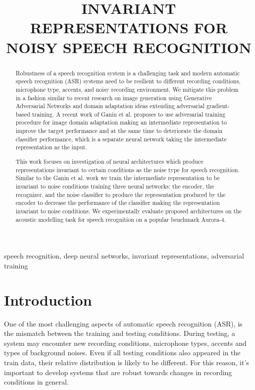 \documentclass{article}
\title{INVARIANT REPRESENTATIONS FOR NOISY SPEECH RECOGNITION}
\begin{document}
%
\maketitle
%
\begin{abstract}
    Robustness of a speech recognition system is a challenging task and modern
    automatic speech recognition (ASR) systems need to be resilient to different recording conditions,
    microphone type, accents, and noisy recording environment. We mitigate
    this problem in a fashion similar to recent research on image generation using
    Generative Adversarial Networks and domain adaptation ideas extending
    adversarial gradient-based training. A recent work of Ganin et al. proposes to
    use adversarial training procedure for image domain adaptation making an intermediate
    representation to improve the target performance and at the same time
    to deteriorate the domain classifier performance, which is a separate neural
    network taking the intermediate representation as the input.

    This work focuses on investigation of neural architectures which produce
    representations invariant to certain conditions as the noise type for speech
    recognition. Similar
    to the Ganin et al. work we train the intermediate representation to be invariant
    to noise conditions training three neural networks: the encoder, the recognizer, and the
    noise classifier to produce the representation produced by the encoder to decrease
    the performance of the classifier making the representation invariant to noise conditions. We
    experimentally evaluate proposed architectures on the acoustic modelling task
    for speech recognition on a popular benchmark Aurora-4.
\end{abstract}
%
\begin{keywords}
speech recognition, deep neural networks, invariant representations, adversarial training
\end{keywords}
%
\section{Introduction}
\label{sec:intro}
    One of the most challenging aspects of automatic speech recognition (ASR),
    is the mismatch between the training and testing conditions. During
    testing, a system may encounter new recording conditions, microphone types,
    accents and types of background noises. Even if all testing conditions also appeared
    in the train data, their relative distribution is likely to be
    different. For this reason, it's important to develop systems that are
    robust towards changes in recording conditions in general.
\end{document}
